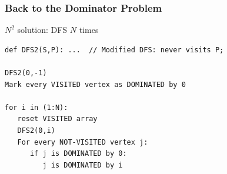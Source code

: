\begin{frame}[fragile]
  \frametitle{Back to the Dominator Problem}

  {\smaller
  \begin{exampleblock}{$N^2$ solution: DFS $N$ times}
\begin{verbatim}
def DFS2(S,P): ...  // Modified DFS: never visits P;

DFS2(0,-1)
Mark every VISITED vertex as DOMINATED by 0

for i in (1:N):
   reset VISITED array
   DFS2(0,i)
   For every NOT-VISITED vertex j:
      if j is DOMINATED by 0:
         j is DOMINATED by i
\end{verbatim}
  \end{exampleblock}}

  \begin{center}
  \end{center}
\end{frame}






